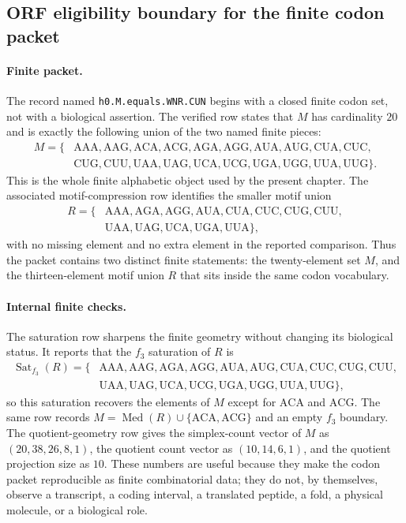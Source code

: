 \subsection{ORF eligibility boundary for the finite codon packet}\label{subsec:bioreality-orf-eligibility-boundary}

\paragraph{Finite packet.}
The record named \texttt{h0.M.equals.WNR.CUN} begins with a closed finite codon set, not with a biological assertion.  The verified row states that $M$ has cardinality $20$ and is exactly the following union of the two named finite pieces:
$$
\begin{aligned}
M = \{&\mathrm{AAA},\mathrm{AAG},\mathrm{ACA},\mathrm{ACG},\mathrm{AGA},\mathrm{AGG},\mathrm{AUA},\mathrm{AUG},\mathrm{CUA},\mathrm{CUC},\\
&\mathrm{CUG},\mathrm{CUU},\mathrm{UAA},\mathrm{UAG},\mathrm{UCA},\mathrm{UCG},\mathrm{UGA},\mathrm{UGG},\mathrm{UUA},\mathrm{UUG}\}.
\end{aligned}
$$
This is the whole finite alphabetic object used by the present chapter.  The associated motif-compression row identifies the smaller motif union
$$
\begin{aligned}
R = \{&\mathrm{AAA},\mathrm{AGA},\mathrm{AGG},\mathrm{AUA},\mathrm{CUA},\mathrm{CUC},\mathrm{CUG},\mathrm{CUU},\\
&\mathrm{UAA},\mathrm{UAG},\mathrm{UCA},\mathrm{UGA},\mathrm{UUA}\},
\end{aligned}
$$
with no missing element and no extra element in the reported comparison.  Thus the packet contains two distinct finite statements: the twenty-element set $M$, and the thirteen-element motif union $R$ that sits inside the same codon vocabulary.

\paragraph{Internal finite checks.}
The saturation row sharpens the finite geometry without changing its biological status.  It reports that the $f_3$ saturation of $R$ is
$$
\begin{aligned}
\operatorname{Sat}_{f_3}(R)=\{&\mathrm{AAA},\mathrm{AAG},\mathrm{AGA},\mathrm{AGG},\mathrm{AUA},\mathrm{AUG},\mathrm{CUA},\mathrm{CUC},\mathrm{CUG},\mathrm{CUU},\\
&\mathrm{UAA},\mathrm{UAG},\mathrm{UCA},\mathrm{UCG},\mathrm{UGA},\mathrm{UGG},\mathrm{UUA},\mathrm{UUG}\},
\end{aligned}
$$
so this saturation recovers the elements of $M$ except for $\mathrm{ACA}$ and $\mathrm{ACG}$.  The same row records $M=\operatorname{Med}(R)\cup\{\mathrm{ACA},\mathrm{ACG}\}$ and an empty $f_3$ boundary.  The quotient-geometry row gives the simplex-count vector of $M$ as $(20,38,26,8,1)$, the quotient count vector as $(10,14,6,1)$, and the quotient projection size as $10$.  These numbers are useful because they make the codon packet reproducible as finite combinatorial data; they do not, by themselves, observe a transcript, a coding interval, a translated peptide, a fold, a physical molecule, or a biological role.

